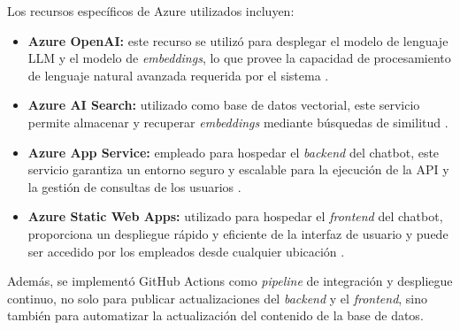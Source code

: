 Los recursos específicos de Azure utilizados incluyen:

\begin{itemize}
	\item \textbf{Azure OpenAI:} este recurso se utilizó para desplegar el modelo de lenguaje LLM y el modelo de \textit{embeddings}, 
	lo que provee la capacidad de procesamiento de lenguaje natural avanzada requerida por el sistema \citep{website:azure-openai}.
	\item \textbf{Azure AI Search:} utilizado como base de datos vectorial, este servicio permite almacenar y recuperar \textit{embeddings} 
	mediante búsquedas de similitud \citep{website:ai-search}.
	\item \textbf{Azure App Service:} empleado para hospedar el \textit{backend} del chatbot, este servicio garantiza un entorno seguro y 
	escalable para la ejecución de la API y la gestión de consultas de los usuarios \citep{website:app-service}.
	\item \textbf{Azure Static Web Apps:} utilizado para hospedar el \textit{frontend} del chatbot, proporciona un despliegue 
	rápido y eficiente de la interfaz de usuario y puede ser accedido por los empleados desde cualquier ubicación \citep{website:static-web-app}.
\end{itemize}

Además, se implementó GitHub Actions \citep{website:github-actions} como \textit{pipeline} de integración y despliegue continuo, no solo para publicar 
actualizaciones del \textit{backend} y el \textit{frontend}, sino también para automatizar la actualización del contenido de la base de datos.